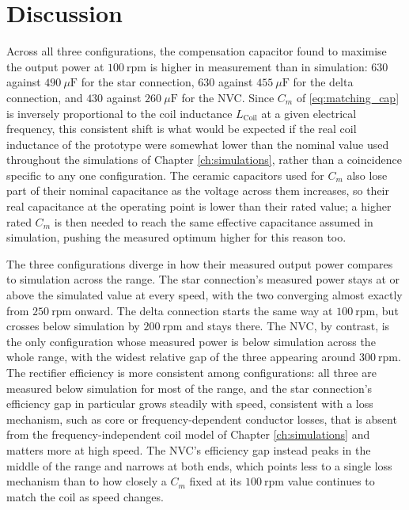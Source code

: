 \section{Discussion}
\label{sec:comp_discussion}

Across all three configurations, the compensation capacitor found to maximise the output power at $100\ \text{rpm}$ is higher in measurement than in simulation: $630$ against $490\ \mu\text{F}$ for the star connection, $630$ against $455\ \mu\text{F}$ for the delta connection, and $430$ against $260\ \mu\text{F}$ for the NVC. Since $C_m$ of \eqref{eq:matching_cap} is inversely proportional to the coil inductance $L_\text{Coil}$ at a given electrical frequency, this consistent shift is what would be expected if the real coil inductance of the prototype were somewhat lower than the nominal value used throughout the simulations of Chapter \ref{ch:simulations}, rather than a coincidence specific to any one configuration. The ceramic capacitors used for $C_m$ also lose part of their nominal capacitance as the voltage across them increases, so their real capacitance at the operating point is lower than their rated value; a higher rated $C_m$ is then needed to reach the same effective capacitance assumed in simulation, pushing the measured optimum higher for this reason too.

The three configurations diverge in how their measured output power compares to simulation across the range. The star connection's measured power stays at or above the simulated value at every speed, with the two converging almost exactly from $250\ \text{rpm}$ onward. The delta connection starts the same way at $100\ \text{rpm}$, but crosses below simulation by $200\ \text{rpm}$ and stays there. The NVC, by contrast, is the only configuration whose measured power is below simulation across the whole range, with the widest relative gap of the three appearing around $300\ \text{rpm}$. The rectifier efficiency is more consistent among configurations: all three are measured below simulation for most of the range, and the star connection's efficiency gap in particular grows steadily with speed, consistent with a loss mechanism, such as core or frequency-dependent conductor losses, that is absent from the frequency-independent coil model of Chapter \ref{ch:simulations} and matters more at high speed. The NVC's efficiency gap instead peaks in the middle of the range and narrows at both ends, which points less to a single loss mechanism than to how closely a $C_m$ fixed at its $100\ \text{rpm}$ value continues to match the coil as speed changes.

